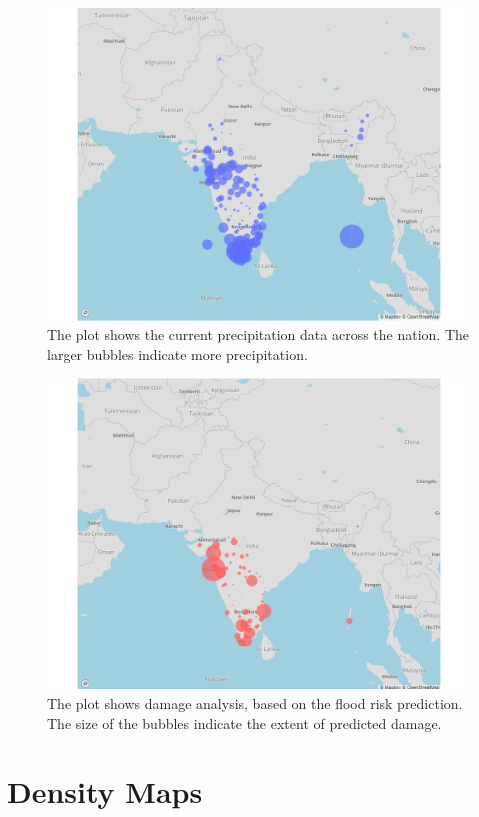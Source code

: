 \documentclass[a4paper,12pt]{report}
\begin{document}
\begin{figure}[ht]
  \centering
  \includegraphics[width=\linewidth]{plot2.png}
  \caption{The plot shows the current precipitation data across the nation. The larger bubbles indicate more precipitation.}
\end{figure}

\begin{figure}[ht]
  \centering
  \includegraphics[width=\linewidth]{plot3.png}
  \caption{The plot shows damage analysis, based on the flood risk prediction. The size of the bubbles indicate the extent of predicted damage.}
\end{figure}

\section{Density Maps}
\end{document}
